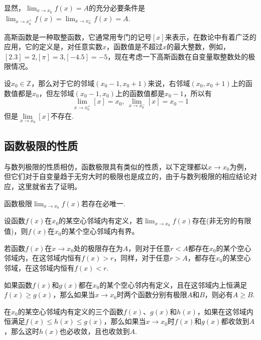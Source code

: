   显然，$\lim_{x \to x_0} f(x) = A$的充分必要条件是 $\lim_{x \to x_0^+} f(x) = \lim_{x \to x_0^-} f(x) = A$.

  \begin{example}
    \label{example:single-limits-of-gausse-function}
    高斯函数是一种取整函数，它通常用专门的记号$[x]$来表示，在数论中有着广泛的应用，它的定义是，对任意实数$x$，函数值是不超过$x$的最大整数，例如，$[2.3]=2$,$[\pi]=3$,$[-4.5]=-5$，现在考虑一下高斯函数在自变量取整数处的极限情况。

    设$x_0 \in \mathbb{Z}$，那么对于它的邻域$(x_0-1,x_0+1)$来说，右邻域$(x_0,x_0+1)$上的函数值都是$x_0$，但左邻域$(x_0-1,x_0)$上的函数值都是$x_0-1$，所以有
    \[ \lim_{x \to x_0^+} [x] = x_0, \  \lim_{x \to x_0^-} [x] = x_0-1 \]
    但是$\lim\limits_{x \to x_0}[x]$不存在. 
\end{example}

\subsection{函数极限的性质}
\label{sec:properties-of-function-limit}


与数列极限的性质相仿，函数极限具有类似的性质，以下定理都以$x\to x_0$为例，但它们对于自变量趋于无穷大时的极限也是成立的，由于与数列极限的相应结论对应，这里就省去了证明。

\begin{property}[唯一性]
  函数极限$\lim_{x \to x_0}f(x)$若存在必唯一.
\end{property}

\begin{theorem}[局部有界性]
  设函数$f(x)$在$x_0$的某空心邻域内有定义，若$\lim_{x \to x_0}f(x)$存在(非无穷的有限值)，则$f(x)$在$x_0$的某个空心邻域内有界。
\end{theorem}

\begin{theorem}[局部保号性]
  若函数$f(x)$在$x \to x_0$处的极限存在为$A$，则对于任意$r<A$都存在$x_0$的某个空心邻域内，在这邻域内恒有$f(x)>r$，同样，对于任意$r>A$，都存在$x_0$的某空心邻域，在这邻域内恒有$f(x)<r$.
\end{theorem}

\begin{theorem}[保不等式性]
 如果函数$f(x)$和$g(x)$都在$x_0$的某个空心邻内有定义，且在这邻域内上恒满足$f(x) \geqslant g(x)$，那么如果当$x \to x_0$时两个函数分别有极限$A$和$B$，则必有$A \geqslant B$.
\end{theorem}

\begin{theorem}[夹逼定理]
  在$x_0$的某空心邻域内有定义的三个函数$f(x)$、$g(x)$和$h(x)$，如果在这邻域内恒满足$f(x) \leqslant h(x) \leqslant g(x)$，那么如果当$x \to x_0$时$f(x)$和$g(x)$都收敛到$A$，那么这时$h(x)$也必收敛，且也收敛到$A$.
\end{theorem}

